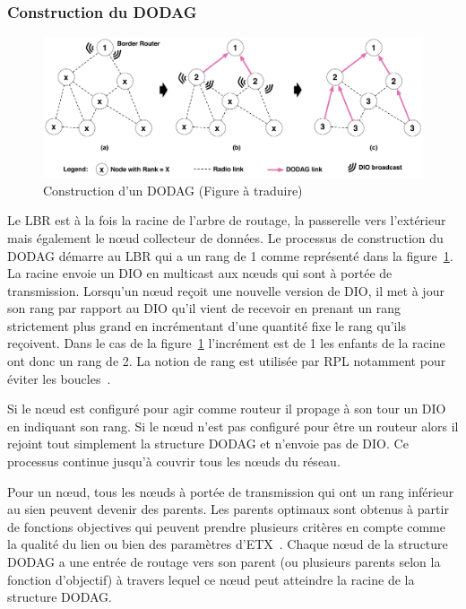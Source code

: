 \subsubsection{Construction du \ac{DODAG}}

\begin{figure}[ht]
  \centering
  \includegraphics[width=\linewidth]{img/dodag.pdf}
  \caption{Construction d'un \ac{DODAG} (Figure à traduire)}
  \label{gw:fig:rpl_construction}
\end{figure}

Le \ac{LBR} est à la fois la racine de l'arbre de routage, la passerelle vers l'extérieur mais également le nœud collecteur de données.
Le processus de construction du \ac{DODAG} démarre au \ac{LBR} qui a un rang de 1 comme  représenté dans la figure~\ref{gw:fig:rpl_construction}.
La racine envoie un \ac{DIO} en multicast aux nœuds qui sont à portée de transmission.
Lorsqu'un nœud reçoit une nouvelle version de \ac{DIO}, il met à jour son rang par rapport au \ac{DIO} qu'il vient de recevoir en prenant un rang strictement plus grand en incrémentant d'une quantité fixe le rang qu'ils reçoivent.
Dans le cas de la figure~\ref{gw:fig:rpl_construction} l'incrément est de 1 les enfants de la racine ont donc un rang de 2.
La notion de rang est utilisée par \ac{RPL} notamment pour éviter les boucles~\cite{rfc6550}.

Si le nœud est configuré pour agir comme routeur il propage à son tour un \ac{DIO} en indiquant son rang.
Si le nœud n’est pas configuré pour être un routeur alors il rejoint tout simplement la structure \ac{DODAG} et n’envoie pas de \ac{DIO}.
Ce processus continue jusqu’à couvrir tous les nœuds du réseau.

Pour un nœud, tous les nœuds à portée de transmission qui ont un rang inférieur au sien peuvent devenir des parents.
Les parents optimaux sont obtenus à partir de fonctions objectives qui peuvent prendre plusieurs critères en compte comme la qualité du lien ou bien des paramètres d'\ac{ETX}~\cite{rfc6550}.
Chaque nœud de la structure \ac{DODAG} a une entrée de routage vers son parent (ou plusieurs parents selon la fonction d’objectif) à travers lequel ce nœud peut atteindre la racine de la structure \ac{DODAG}.

